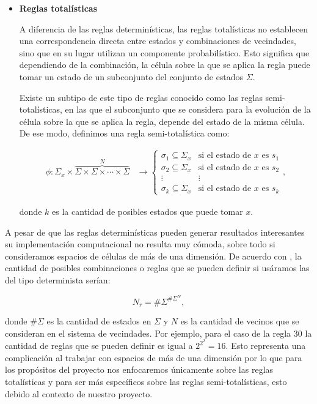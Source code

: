\begin{itemize}
    
    \item \textbf{Reglas totalísticas}
    
    A diferencia de las reglas determinísticas, las reglas totalísticas no establecen una correspondencia directa entre estados y combinaciones de vecindades, sino que en su lugar utilizan un componente probabilístico. Esto significa que dependiendo de la combinación, la célula sobre la que se aplica la regla puede tomar un estado de un subconjunto del conjunto de estados $\Sigma$. 
    
    Existe un subtipo de este tipo de reglas conocido como las reglas semi-totalísticas, en las que el subconjunto que se considera para la evolución de la célula sobre la que se aplica la regla, depende del estado de la misma célula. De ese modo, definimos una regla semi-totalística como:
    
    \begin{align*}
        \phi:\Sigma_x\times\overbrace{\Sigma\times\Sigma\times\cdots\times\Sigma}^{N}&\longrightarrow \left\{ \begin{array}{cc}
        \sigma_1 \subseteq \Sigma_x & \text{si el estado de }x\text{ es }s_1 \\
        \sigma_2 \subseteq \Sigma_x & \text{si el estado de }x\text{ es }s_2 \\
        \vdots & \vdots \\
        \sigma_k \subseteq \Sigma_x & \text{si el estado de }x\text{ es }s_k
        \end{array} \right. ,
    \end{align*}
    
    donde $k$ es la cantidad de posibles estados que puede tomar $x$.
\end{itemize}

A pesar de que las reglas determinísticas pueden generar resultados interesantes su implementación computacional no resulta muy cómoda, sobre todo si consideramos espacios de células de más de una dimensión. De acuerdo con \cite{alfons2010}, la cantidad de posibles combinaciones o reglas que se pueden definir si usáramos las del tipo determinista serían:

$$N_r=\#\Sigma^{\#\Sigma^N},$$

donde $\#\Sigma$ es la cantidad de estados en $\Sigma$ y $N$ es la cantidad de vecinos que se consideran en el sistema de vecindades. Por ejemplo, para el caso de la regla 30 la cantidad de reglas que se pueden definir es igual a $2^{2^2}=16$. Esto representa una complicación al trabajar con espacios de más de una dimensión por lo que para los propósitos del proyecto nos enfocaremos únicamente sobre las reglas totalísticas y para ser más específicos sobre las reglas semi-totalísticas, esto debido al contexto de nuestro proyecto.

